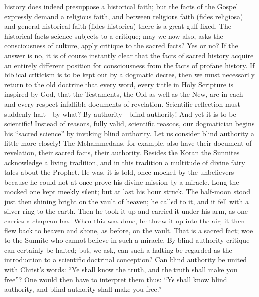 \documentclass[12pt]{book}
\newcommand{\opage}[1]{\marginnote{\footnotesize\textit{[#1]}}}
\begin{document}
history does indeed presuppose a historical faith; but the facts of the
Gospel expressly demand a religious faith, and between religious faith
(fides religiosa) and general historical faith (fides historica) there
is a great gulf fixed. The historical facts science subjects to a
critique; may we now also, asks the consciousness of culture, apply
critique to the sacred facts? Yes or no? If the answer is no, it is of
course instantly clear that the facts of sacred history acquire an
entirely different position for consciousness from the facts of profane
history. If biblical criticism is to be kept out by a dogmatic decree,
then we must necessarily return to the old doctrine that every word,
every tittle in Holy Scripture is inspired by God, that the Testaments,
the Old as well as the New, are in each and every respect infallible
documents of revelation. Scientific reflection must suddenly halt---by
what? By authority---blind authority! And yet it is to be scientific!
Instead of reasons, fully valid, scientific reasons, our dogmatician
begins his ``sacred science'' by invoking blind authority. Let us
consider blind authority a little more closely! The Mohammedans, for
example, also have their document of revelation, their sacred facts,
their authority. Besides the Koran the Sunnites acknowledge a living
tradition, and in this tradition a multitude of divine fairy tales about
the Prophet. He was, it is told, once mocked by the unbelievers because
he could not at once prove his divine mission by a miracle. Long the
mocked one kept meekly silent; but at last his hour struck. The
half-moon
\opage{83}\setcounter{footnote}{0}%
stood just then shining bright on the vault of heaven; he called to it,
and it fell with a silver ring to the earth. Then he took it up and
carried it under his arm, as one carries a chapeau-bas. When this was
done, he threw it up into the air; it then flew back to heaven and shone,
as before, on the vault. That is a sacred fact; woe to the Sunnite who
cannot believe in such a miracle. By blind authority critique can
certainly be halted; but, we ask, can such a halting be regarded as the
introduction to a scientific doctrinal conception? Can blind authority be
united with Christ's words: ``Ye shall know the truth, and the truth
shall make you free''? One would then have to interpret them thus: ``Ye
shall know blind authority, and blind authority shall make you free.''
\end{document}
